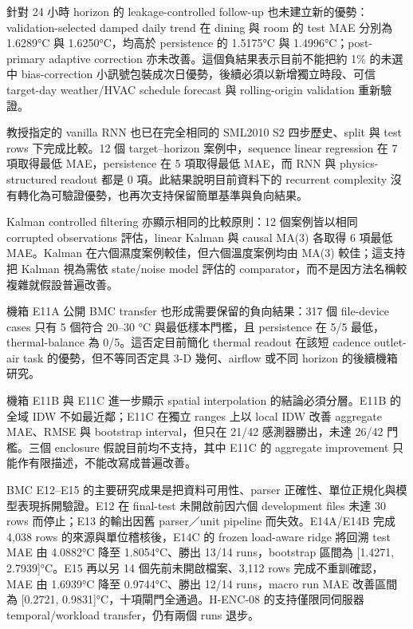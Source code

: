 \documentclass[12pt,a4paper]{article}
\begin{document}
針對 24 小時 horizon 的 leakage-controlled follow-up 也未建立新的優勢：validation-selected damped daily trend 在 dining 與 room 的 test MAE 分別為 1.6289°C 與 1.6250°C，均高於 persistence 的 1.5175°C 與 1.4996°C；post-primary adaptive correction 亦未改善。這個負結果表示目前不能把約 1\% 的未選中 bias-correction 小訊號包裝成次日優勢，後續必須以新增獨立時段、可信 target-day weather/HVAC schedule forecast 與 rolling-origin validation 重新驗證。


教授指定的 vanilla RNN 也已在完全相同的 SML2010 S2 四步歷史、split 與 test rows 下完成比較。12 個 target--horizon 案例中，sequence linear regression 在 7 項取得最低 MAE，persistence 在 5 項取得最低 MAE，而 RNN 與 physics-structured readout 都是 0 項。此結果說明目前資料下的 recurrent complexity 沒有轉化為可驗證優勢，也再次支持保留簡單基準與負向結果。


Kalman controlled filtering 亦顯示相同的比較原則：12 個案例皆以相同 corrupted observations 評估，linear Kalman 與 causal MA(3) 各取得 6 項最低 MAE。Kalman 在六個濕度案例較佳，但六個溫度案例均由 MA(3) 較佳；這支持把 Kalman 視為需依 state/noise model 評估的 comparator，而不是因方法名稱較複雜就假設普遍改善。


機箱 E11A 公開 BMC transfer 也形成需要保留的負向結果：317 個 file-device cases 只有 5 個符合 20–30 °C 與最低樣本門檻，且 persistence 在 5/5 最低，thermal-balance 為 0/5。這否定目前簡化 thermal readout 在該短 cadence outlet-air task 的優勢，但不等同否定具 3-D 幾何、airflow 或不同 horizon 的後續機箱研究。


機箱 E11B 與 E11C 進一步顯示 spatial interpolation 的結論必須分層。E11B 的全域 IDW 不如最近鄰；E11C 在獨立 ranges 上以 local IDW 改善 aggregate MAE、RMSE 與 bootstrap interval，但只在 21/42 感測器勝出，未達 26/42 門檻。三個 enclosure 假說目前均不支持，其中 E11C 的 aggregate improvement 只能作有限描述，不能改寫成普遍改善。


BMC E12–E15 的主要研究成果是把資料可用性、parser 正確性、單位正規化與模型表現拆開驗證。E12 在 final-test 未開啟前因六個 development files 未達 30 rows 而停止；E13 的輸出因舊 parser／unit pipeline 而失效。E14A/E14B 完成 4,038 rows 的來源與單位稽核後，E14C 的 frozen load-aware ridge 將回溯 test MAE 由 4.0882°C 降至 1.8054°C、勝出 13/14 runs，bootstrap 區間為 [1.4271, 2.7939]°C。E15 再以另 14 個先前未開啟檔案、3,112 rows 完成不重訓確認，MAE 由 1.6939°C 降至 0.9744°C、勝出 12/14 runs，macro run MAE 改善區間為 [0.2721, 0.9831]°C，十項閘門全通過。H-ENC-08 的支持僅限同伺服器 temporal/workload transfer，仍有兩個 runs 退步。
\end{document}
